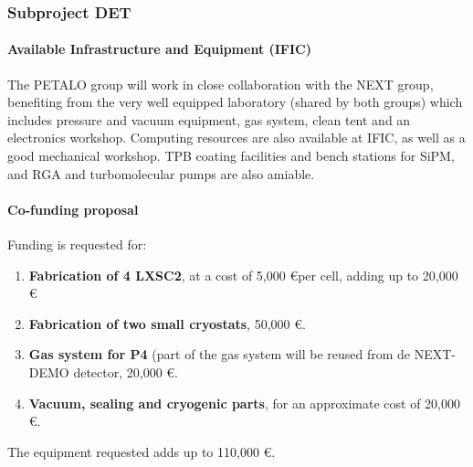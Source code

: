 \subsubsection*{Subproject DET}
\paragraph{Available Infrastructure and Equipment (IFIC)}

The PETALO group will work in close collaboration with the NEXT group, benefiting from the very well equipped laboratory (shared by both groups) which includes pressure and vacuum equipment, gas system, clean tent and an electronics workshop. Computing resources are also available at IFIC, as well as a good mechanical workshop. TPB coating facilities and bench stations for SiPM, and RGA and turbomolecular pumps are also amiable. 

\paragraph{Co-funding proposal}
Funding is requested for:

\begin{enumerate}
\item {\bf Fabrication of 4 LXSC2}, at a cost of 5,000 \euro per cell, adding up to 20,000 \euro
\item {\bf Fabrication of two small cryostats},  50,000 \euro.
\item {\bf Gas system for P4} (part of the gas system will be reused from de NEXT-DEMO detector,  20,000 \euro.
\item {\bf Vacuum, sealing and cryogenic parts}, for an approximate cost of 20,000 \euro.
\end{enumerate}

The equipment requested adds up to 110,000 \euro. 